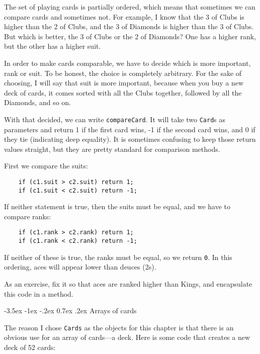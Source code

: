 \documentclass{book}
\makeatletter
\renewcommand{\section}{\@startsection 
    {section} {1} {0mm}%
    {-3.5ex \@plus -1ex \@minus -.2ex}%
    {0.7ex \@plus.2ex}%
    {\normalfont\Large\bfseries}}
\makeatother
\begin{document}
The set of playing cards is partially ordered, which means that
sometimes we can compare cards and sometimes not.  For example, I know
that the 3 of Clubs is higher than the 2 of Clubs, and the 3 of
Diamonds is higher than the 3 of Clubs.  But which is better, the 3 of
Clubs or the 2 of Diamonds?  One has a higher rank, but the other has
a higher suit.


In order to make cards comparable, we have to decide which is more
important, rank or suit.  To be honest, the choice is completely
arbitrary.  For the sake of choosing, I will say that suit is more
important, because when you buy a new deck of cards, it comes sorted
with all the Clubs together, followed by all the Diamonds, and so on.

With that decided, we can write {\tt compareCard}.  It
will take two {\tt Card}s as parameters and return 1 if
the first card wins, -1 if the second card wins, and 0 if
they tie (indicating deep equality).  It is sometimes confusing
to keep those return values straight, but they are pretty
standard for comparison methods.

First we compare the suits:

\begin{verbatim}
    if (c1.suit > c2.suit) return 1;
    if (c1.suit < c2.suit) return -1;
\end{verbatim}
%
If neither statement is true, then the suits must be equal,
and we have to compare ranks:

\begin{verbatim}
    if (c1.rank > c2.rank) return 1;
    if (c1.rank < c2.rank) return -1;
\end{verbatim}
%
If neither of these is true, the ranks must be equal,
so we return {\tt 0}.  In this ordering, aces will appear
lower than deuces (2s).

As an exercise, fix it so that aces are ranked higher than Kings, and
encapsulate this code in a method.


\section{Arrays of cards}
\label{cardarray}

The reason I chose {\tt Cards} as the objects for this chapter is that
there is an obvious use for an array of cards---a deck.  Here is some
code that creates a new deck of 52 cards:
\end{document}
